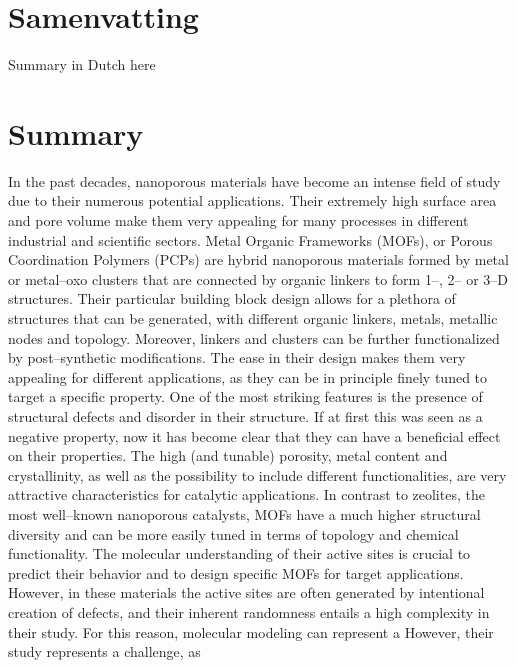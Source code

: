 \chapter{Samenvatting}
Summary in Dutch here

\chapter{Summary}
In the past decades, nanoporous materials have become an intense field of study due to their numerous potential applications. Their extremely high surface area and pore volume make them very appealing for many processes in different industrial and scientific sectors.
\npar
Metal Organic Frameworks (MOFs), or Porous Coordination Polymers (PCPs) are hybrid nanoporous materials formed by metal or metal--oxo clusters that are connected by organic linkers to form 1--, 2-- or 3--D structures. Their particular building block design allows for a plethora of structures that can be generated, with different organic linkers, metals, metallic nodes and topology. Moreover, linkers and clusters can be further functionalized by post--synthetic modifications. The ease in their design makes them very appealing for different applications, as they can be in principle finely tuned to target a specific property. One of the most striking features is the presence of structural defects and disorder in their structure. If at first this was seen as a negative property, now it has become clear that they can have a beneficial effect on their properties. 
\npar
The high (and tunable) porosity, metal content and crystallinity, as well as the possibility to include different functionalities, are very attractive characteristics for catalytic applications. In contrast to zeolites, the most well--known nanoporous catalysts, MOFs have a much higher structural diversity and can be more easily tuned in terms of topology and chemical functionality. The molecular understanding of their active sites is crucial to predict their behavior and to design specific MOFs for target applications. However, in these materials the active sites are often generated by intentional creation of defects, and their inherent randomness entails a high complexity in their study.
\npar
For this reason, molecular modeling can represent a  
However, their study represents a challenge, as 



